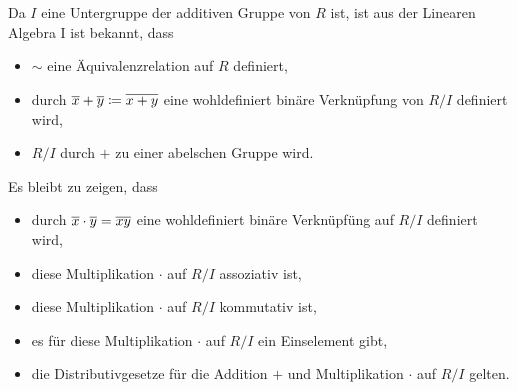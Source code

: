 \section{}





\subsection{}
Da $I$ eine Untergruppe der additiven Gruppe von $R$ ist, ist aus der Linearen Algebra I ist bekannt, dass
\begin{itemize}
  \item
    $\sim$ eine Äquivalenzrelation auf $R$ definiert,
  \item
    durch $\overline{x} + \overline{y} \coloneqq \overline{x+y}$ eine wohldefiniert binäre Verknüpfung von $R/I$ definiert wird,
  \item
    $R/I$ durch $+$ zu einer abelschen Gruppe wird.
\end{itemize}
Es bleibt zu zeigen, dass
\begin{itemize}
  \item
    durch $\overline{x} \cdot \overline{y} = \overline{xy}$ eine wohldefiniert binäre Verknüpfüng auf $R/I$ definiert wird,
  \item
    diese Multiplikation $\cdot$ auf $R/I$ assoziativ ist,
  \item
    diese Multiplikation $\cdot$ auf $R/I$ kommutativ ist,
  \item
    es für diese Multiplikation $\cdot$ auf $R/I$ ein Einselement gibt,
  \item
    die Distributivgesetze für die Addition $+$ und Multiplikation $\cdot$ auf $R/I$ gelten.
\end{itemize}

